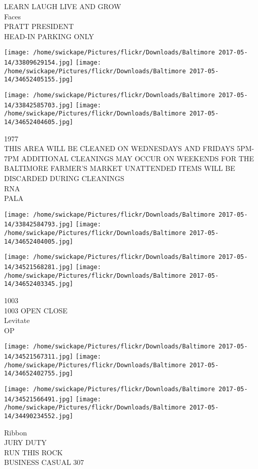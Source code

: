 \documentclass[10pt,letterpaper]{article}
\begin{document}
LEARN LAUGH LIVE AND GROW\\
Faces\\
PRATT PRESIDENT\\
HEAD{-}IN PARKING ONLY
\pagebreak

\texttt{[image: /home/swickape/Pictures/flickr/Downloads/Baltimore 2017-05-14/33809629154.jpg]}
\texttt{[image: /home/swickape/Pictures/flickr/Downloads/Baltimore 2017-05-14/34652405155.jpg]}

\texttt{[image: /home/swickape/Pictures/flickr/Downloads/Baltimore 2017-05-14/33842585703.jpg]}
\texttt{[image: /home/swickape/Pictures/flickr/Downloads/Baltimore 2017-05-14/34652404605.jpg]}

1977\\
THIS AREA WILL BE CLEANED ON WEDNESDAYS AND FRIDAYS 5PM{-}7PM ADDITIONAL CLEANINGS MAY OCCUR ON WEEKENDS FOR THE BALTIMORE FARMER'S MARKET UNATTENDED ITEMS WILL BE DISCARDED DURING CLEANINGS\\
RNA\\
PALA
\pagebreak

\texttt{[image: /home/swickape/Pictures/flickr/Downloads/Baltimore 2017-05-14/33842584793.jpg]}
\texttt{[image: /home/swickape/Pictures/flickr/Downloads/Baltimore 2017-05-14/34652404005.jpg]}

\texttt{[image: /home/swickape/Pictures/flickr/Downloads/Baltimore 2017-05-14/34521568281.jpg]}
\texttt{[image: /home/swickape/Pictures/flickr/Downloads/Baltimore 2017-05-14/34652403345.jpg]}

1003\\
1003 OPEN CLOSE\\
Levitate\\
OP
\pagebreak

\texttt{[image: /home/swickape/Pictures/flickr/Downloads/Baltimore 2017-05-14/34521567311.jpg]}
\texttt{[image: /home/swickape/Pictures/flickr/Downloads/Baltimore 2017-05-14/34652402755.jpg]}

\texttt{[image: /home/swickape/Pictures/flickr/Downloads/Baltimore 2017-05-14/34521566491.jpg]}
\texttt{[image: /home/swickape/Pictures/flickr/Downloads/Baltimore 2017-05-14/34490234552.jpg]}

Ribbon\\
JURY DUTY\\
RUN THIS ROCK\\
BUSINESS CASUAL 307
\pagebreak
\end{document}

